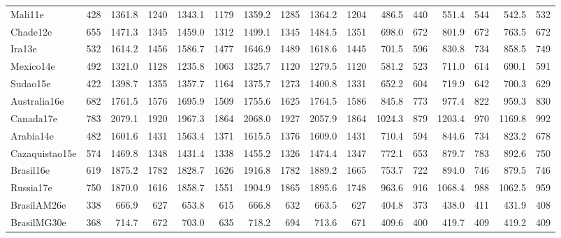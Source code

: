 \begin{landscape}
\begin{table}[htb]
{\begin{tabular}{@{}lr|rr|rr|rr|rr|rr|rr|rr@{}}
Mali11e&428&1361.8&1240&1343.1&1179&1359.2&1285&1364.2&1204&486.5&440&551.4&544&542.5&532\\
Chade12e&655&1471.3&1345&1459.0&1312&1499.1&1345&1484.5&1351&698.0&672&801.9&672&763.5&672\\
Ira13e&532&1614.2&1456&1586.7&1477&1646.9&1489&1618.6&1445&701.5&596&830.8&734&858.5&749\\
Mexico14e&492&1321.0&1128&1235.8&1063&1325.7&1120&1279.5&1120&581.2&523&711.0&614&690.1&591\\
Sudao15e&422&1398.7&1355&1357.7&1164&1375.7&1273&1400.8&1331&652.2&604&719.9&642&700.3&629\\
Australia16e&682&1761.5&1576&1695.9&1509&1755.6&1625&1764.5&1586&845.8&773&977.4&822&959.3&830\\
Canada17e&783&2079.1&1920&1967.3&1864&2068.0&1927&2057.9&1864&1024.3&879&1203.4&970&1169.8&992\\
Arabia14e&482&1601.6&1431&1563.4&1371&1615.5&1376&1609.0&1431&710.4&594&844.6&734&823.2&678\\
Cazaquistao15e&574&1469.8&1348&1431.4&1338&1455.2&1326&1474.4&1347&772.1&653&879.7&783&892.6&750\\
Brasil16e&619&1875.2&1782&1828.7&1626&1916.8&1782&1889.2&1665&753.7&722&894.0&746&879.5&746\\
Russia17e&750&1870.0&1616&1858.7&1551&1904.9&1865&1895.6&1748&963.6&916&1068.4&988&1062.5&959\\
BrasilAM26e&338&666.9&627&653.8&615&666.8&632&663.5&627&404.8&373&438.0&411&431.9&408\\
BrasilMG30e&368&714.7&672&703.0&635&718.2&694&713.6&671&409.6&400&419.7&409&419.2&409\\
\bottomrule
\end{tabular}
}
\end{table}
\end{landscape}
